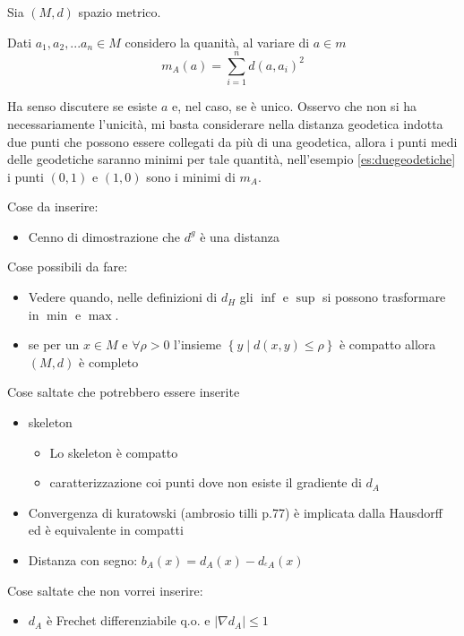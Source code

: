 \documentclass[a4paper,10pt]{article}
\theoremstyle{plain}
\theoremstyle{definition}
\theoremstyle{remark}
\newcommand{\set}[1]{\left\{#1\right\}}
\newcommand{\abs}[1]{\left|#1\right|}
\begin{document}
Sia $(M,d)$ spazio metrico.

Dati $a_1,a_2,... a_n \in M$ considero la quanità, al variare di $a
\in m$
\[ m_A (a) = \sum _{i = 1} ^n d(a,a_i)^2 \]

Ha senso discutere se esiste $a$ e, nel caso, se è unico. Osservo che
non si ha necessariamente l'unicità, mi basta considerare nella
distanza geodetica indotta due punti che possono essere collegati da
più di una geodetica, allora i punti medi delle geodetiche saranno
minimi per tale quantità, nell'esempio \ref{es:duegeodetiche} i punti
$(0,1)$ e $(1,0)$ sono i minimi di $m_A$.

\newpage





\newpage

Cose da inserire:
\begin{itemize}
\item Cenno di dimostrazione che $d^g$ è una distanza
\end{itemize}

Cose possibili da fare:

\begin{itemize}
\item Vedere quando, nelle definizioni di $d_H$ gli $\inf$ e $\sup$ si
  possono trasformare in $\min$ e $\max$.
\item se per un $x \in M$ e $\forall \rho > 0$ l'insieme $\set{ y \mid
    d(x,y) \le \rho}$ è compatto allora $(M,d)$ è completo
\end{itemize}


Cose saltate che potrebbero essere inserite
\begin{itemize}
\item skeleton
  \begin{itemize}
  \item Lo skeleton è compatto
  \item caratterizzazione coi punti dove non esiste il gradiente di
    $d_A$
  \end{itemize}
\item Convergenza di kuratowski (ambrosio tilli p.77) è implicata
  dalla Hausdorff ed è equivalente in compatti
\item Distanza con segno: $b_A(x) = d_A(x) - d_{^cA}(x)$
\end{itemize}


Cose saltate che non vorrei inserire:
\begin{itemize}
\item $d_A$ è Frechet differenziabile q.o. e $\abs{\nabla d_A} \le 1$
\end{itemize}
\end{document}
